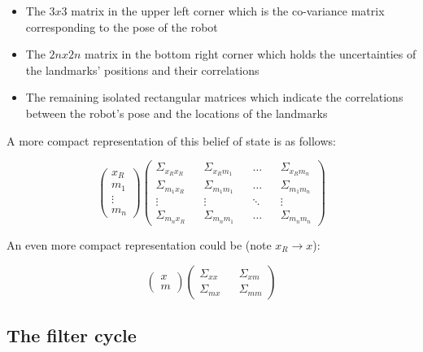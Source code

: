 \documentclass[a4paper]{article}
\begin{document}
\begin{itemize}
    \item The $3x3$ matrix in the upper left corner which is the co-variance matrix corresponding to the pose of the robot
    \item The $2nx2n$ matrix in the bottom right corner which holds the uncertainties of the landmarks' positions and their correlations
    \item The remaining isolated rectangular matrices which indicate the correlations between the robot's pose and the locations of the landmarks
\end{itemize}

A more compact representation of this belief of state is as follows:

\begin{equation*}
    \begin{pmatrix}
    x_R \\ m_1 \\ \vdots \\ m_n
    \end{pmatrix}
    \begin{pmatrix}
    \Sigma_{x_R x_R} && \Sigma_{x_R m_1} && \hdots && \Sigma_{x_R m_n}
    \\
    \Sigma_{m_1 x_R} && \Sigma_{m_1 m_1} && \hdots && \Sigma_{m_1 m_n}
    \\
    \vdots && \vdots && \ddots && \vdots
    \\
    \Sigma_{m_n x_R} && \Sigma_{m_n m_1} && \hdots && \Sigma_{m_n m_n}
    \end{pmatrix}
\end{equation*}

An even more compact representation could be (note $x_R \rightarrow x$):

\begin{equation*}
    \begin{pmatrix}
    x \\ m
    \end{pmatrix}
    \begin{pmatrix}
    \Sigma_{xx} && \Sigma_{xm}
    \\
    \Sigma_{mx} && \Sigma_{mm}
    \end{pmatrix}
\end{equation*}

\subsection{The filter cycle}
\end{document}
